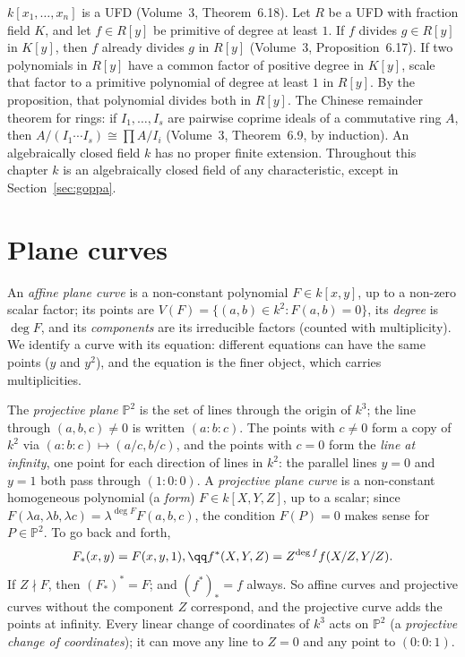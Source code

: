 \begin{reminder}
$k[x_1,\dots,x_n]$ is a UFD (Volume~3, Theorem~6.18). Let $R$ be a UFD with fraction field $K$, and let $f\in R[y]$ be primitive of degree at least $1$. If $f$ divides $g\in R[y]$ in $K[y]$, then $f$ already divides $g$ in $R[y]$ (Volume~3, Proposition~6.17). If two polynomials in $R[y]$ have a common factor of positive degree in $K[y]$, scale that factor to a primitive polynomial of degree at least $1$ in $R[y]$. By the proposition, that polynomial divides both in $R[y]$. The Chinese remainder theorem for rings:
if $I_1,\dots,I_s$ are pairwise coprime ideals of a commutative ring $A$, then $A/(I_1\cdots I_s)\cong\prod A/I_i$ (Volume~3, Theorem~6.9, by
induction). An algebraically closed field $k$ has no proper finite extension. Throughout this chapter $k$ is an algebraically closed
field of any characteristic, except in Section~\ref{sec:goppa}.
\end{reminder}

\section{Plane curves}

An \emph{affine plane curve} is a non-constant polynomial $F\in k[x,y]$, up to a non-zero scalar factor; its points are
$V(F)=\{(a,b)\in k^2:F(a,b)=0\}$, its \emph{degree} is $\deg F$, and its \emph{components} are its irreducible factors (counted with
multiplicity). We identify a curve with its equation: different equations can have the same points ($y$ and $y^2$), and the equation is the
finer object, which carries multiplicities.

The \emph{projective plane} $\mathbb P^2$ is the set of lines through the origin of $k^3$; the line through $(a,b,c)\ne0$ is written
$(a:b:c)$. The points with $c\ne0$ form a copy of $k^2$ via $(a:b:c)\mapsto(a/c,b/c)$, and the points with $c=0$ form the \emph{line at
infinity}, one point for each direction of lines in $k^2$: the parallel lines $y=0$ and $y=1$ both pass through $(1:0:0)$. A
\emph{projective plane curve} is a non-constant homogeneous polynomial (a \emph{form}) $F\in k[X,Y,Z]$, up to a scalar; since
$F(\lambda a,\lambda b,\lambda c)=\lambda^{\deg F}F(a,b,c)$, the condition $F(P)=0$ makes sense for $P\in\mathbb P^2$. To go back and forth,
\[
F_*(x,y)=F(x,y,1),\qq f^*(X,Y,Z)=Z^{\deg f}f(X/Z,Y/Z).
\]
If $Z\nmid F$, then $(F_*)^*=F$; and $(f^*)_*=f$ always. So affine curves and projective curves without the component $Z$ correspond, and the
projective curve adds the points at infinity. Every linear change of coordinates of $k^3$ acts on $\mathbb P^2$ (a \emph{projective change of
coordinates}); it can move any line to $Z=0$ and any point to $(0:0:1)$.

